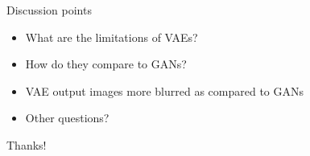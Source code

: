 \documentclass{beamer}
\begin{document}
\begin{frame}{Discussion points}

    \begin{itemize}
        \item What are the limitations of VAEs?
        \item How do they compare to GANs?
        \item VAE output images more blurred as compared to GANs
        \item Other questions?
    \end{itemize}

    \vspace{3mm}
    \centering
    {\Huge Thanks!}

\end{frame}
\end{document}
